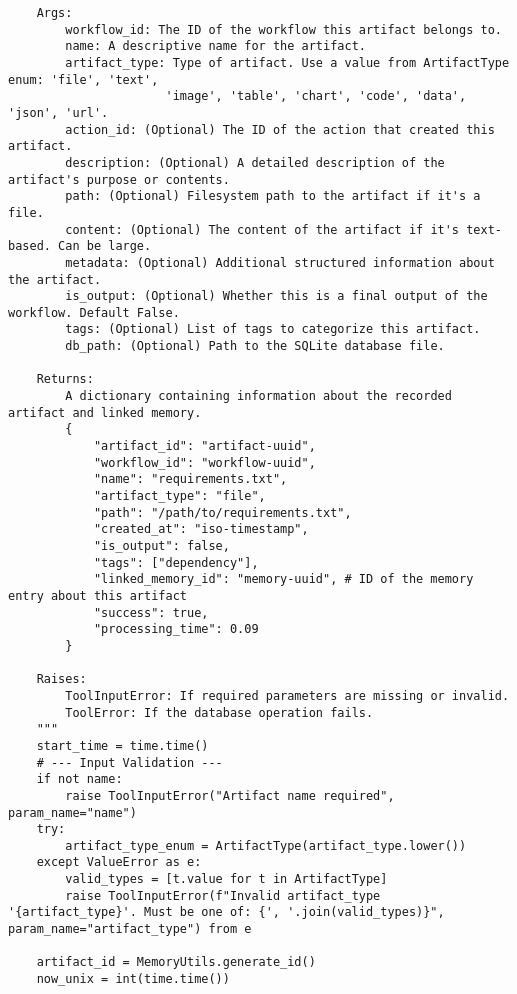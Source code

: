 \documentclass[12pt,a4paper]{article}
\begin{document}
\begin{pageablecode}
\begin{verbatim}
    Args:
        workflow_id: The ID of the workflow this artifact belongs to.
        name: A descriptive name for the artifact.
        artifact_type: Type of artifact. Use a value from ArtifactType enum: 'file', 'text',
                      'image', 'table', 'chart', 'code', 'data', 'json', 'url'.
        action_id: (Optional) The ID of the action that created this artifact.
        description: (Optional) A detailed description of the artifact's purpose or contents.
        path: (Optional) Filesystem path to the artifact if it's a file.
        content: (Optional) The content of the artifact if it's text-based. Can be large.
        metadata: (Optional) Additional structured information about the artifact.
        is_output: (Optional) Whether this is a final output of the workflow. Default False.
        tags: (Optional) List of tags to categorize this artifact.
        db_path: (Optional) Path to the SQLite database file.

    Returns:
        A dictionary containing information about the recorded artifact and linked memory.
        {
            "artifact_id": "artifact-uuid",
            "workflow_id": "workflow-uuid",
            "name": "requirements.txt",
            "artifact_type": "file",
            "path": "/path/to/requirements.txt",
            "created_at": "iso-timestamp",
            "is_output": false,
            "tags": ["dependency"],
            "linked_memory_id": "memory-uuid", # ID of the memory entry about this artifact
            "success": true,
            "processing_time": 0.09
        }

    Raises:
        ToolInputError: If required parameters are missing or invalid.
        ToolError: If the database operation fails.
    """
    start_time = time.time()
    # --- Input Validation ---
    if not name:
        raise ToolInputError("Artifact name required", param_name="name")
    try:
        artifact_type_enum = ArtifactType(artifact_type.lower())
    except ValueError as e:
        valid_types = [t.value for t in ArtifactType]
        raise ToolInputError(f"Invalid artifact_type '{artifact_type}'. Must be one of: {', '.join(valid_types)}", param_name="artifact_type") from e

    artifact_id = MemoryUtils.generate_id()
    now_unix = int(time.time())


\end{verbatim}
\end{pageablecode}
\end{document}
